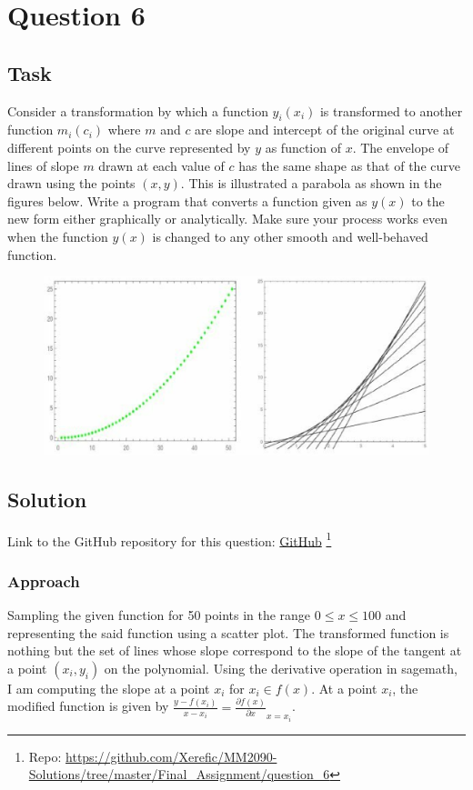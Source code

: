\section{Question 6}

\subsection{Task}
Consider a transformation by which a function $y_i\left(x_i\right)$ is transformed to another function $m_i\left(c_i\right)$  where $m$ and $c$ are slope and intercept of the original curve at different points on the curve represented by $y$ as function of $x$. The envelope of lines of slope $m$ drawn at each value of $c$ has the same shape as that of the curve drawn using the points $\left(x,y\right)$. This is illustrated a parabola as shown in the figures below. Write a program that converts a function given as $y\left(x\right)$ to the new form either graphically or analytically. Make sure your process works even when the function $y\left(x\right)$ is changed to any other smooth and well-behaved function.
\begin{figure}[!ht]
\begin{center}
	\includegraphics[width=0.75\paperwidth]{question_6/question6.eps} 
\end{center}
\end{figure} 

\subsection{Solution}

Link to the GitHub repository for this question: \href{https://github.com/Xerefic/MM2090-Solutions/tree/master/Final_Assignment/question_6}{GitHub} \footnote{Repo: \url{https://github.com/Xerefic/MM2090-Solutions/tree/master/Final_Assignment/question_6}}

\subsubsection{Approach}
Sampling the given function for 50 points in the range $0 \leq x \leq 100$ and representing the said function using a scatter plot. The transformed function is nothing but the set of lines whose slope correspond to the slope of the tangent at a point $\left(x_i,y_i\right)$ on the polynomial. Using the derivative operation in sagemath, I am computing the slope at a point $x_i$ for $x_i \in f(x)$. At a point $x_i$, the modified function is given by $\frac{y-f(x_i)}{x-x_i}=\frac{\partial f(x)}{\partial x}_{x=x_i}$. 

